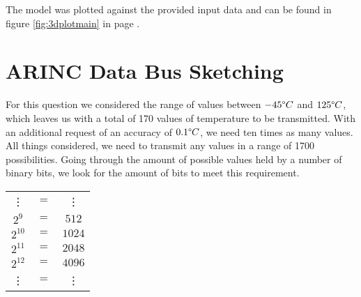 \documentclass[english,palatino]{ist-report}
\begin{document}
The model was plotted against the provided input data and can be found in figure \ref{fig:3dplotmain} in page \pageref{fig:3dplotmain}.
%

\section{ARINC Data Bus Sketching}

For this question we considered the range of values between $\num{-45}\degree C$ and $\num{125}\degree C$, which leaves us with a total of 170 values of temperature to be transmitted. With an additional request of an accuracy of $\num{0.1}\degree C$, we need ten times as many values. All things considered, we need to transmit any values in a range of 1700 possibilities. Going through the amount of possible values held by a number of binary bits, we look for the amount of bits to meet this requirement.

\begin{table}[ht]
	\centering
	\begin{tabular}{ccc}
		\vdots		& $=$	& \vdots	\\
		$2^9$		& $=$	& $512$		\\
		$2^{10}$	& $=$	& $1024$	\\
		$2^{11}$	& $=$	& $2048$	\\
		$2^{12}$	& $=$	& $4096$	\\
		\vdots		& $=$	& \vdots	\\
	\end{tabular}
\end{table}
\end{document}
